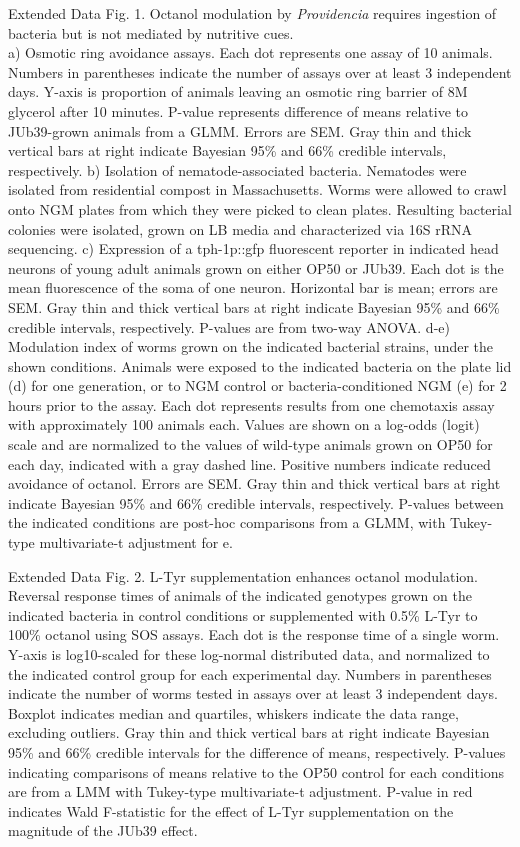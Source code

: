 \documentclass[]{article}
\begin{document}
Extended Data Fig. 1. Octanol modulation by \textit{Providencia}
requires ingestion of bacteria but is not mediated by nutritive cues.\\
a) Osmotic ring avoidance assays. Each dot represents one assay of 10
animals. Numbers in parentheses indicate the number of assays over at
least 3 independent days. Y-axis is proportion of animals leaving an
osmotic ring barrier of 8M glycerol after 10 minutes. P-value represents
difference of means relative to JUb39-grown animals from a GLMM. Errors
are SEM. Gray thin and thick vertical bars at right indicate Bayesian
95\% and 66\% credible intervals, respectively. b) Isolation of
nematode-associated bacteria. Nematodes were isolated from residential
compost in Massachusetts. Worms were allowed to crawl onto NGM plates
from which they were picked to clean plates. Resulting bacterial
colonies were isolated, grown on LB media and characterized via 16S rRNA
sequencing. c) Expression of a tph-1p::gfp fluorescent reporter in
indicated head neurons of young adult animals grown on either OP50 or
JUb39. Each dot is the mean fluorescence of the soma of one neuron.
Horizontal bar is mean; errors are SEM. Gray thin and thick vertical
bars at right indicate Bayesian 95\% and 66\% credible intervals,
respectively. P-values are from two-way ANOVA. d-e) Modulation index of
worms grown on the indicated bacterial strains, under the shown
conditions. Animals were exposed to the indicated bacteria on the plate
lid (d) for one generation, or to NGM control or bacteria-conditioned
NGM (e) for 2 hours prior to the assay. Each dot represents results from
one chemotaxis assay with approximately 100 animals each. Values are
shown on a log-odds (logit) scale and are normalized to the values of
wild-type animals grown on OP50 for each day, indicated with a gray
dashed line. Positive numbers indicate reduced avoidance of octanol.
Errors are SEM. Gray thin and thick vertical bars at right indicate
Bayesian 95\% and 66\% credible intervals, respectively. P-values
between the indicated conditions are post-hoc comparisons from a GLMM,
with Tukey-type multivariate-t adjustment for e.

Extended Data Fig. 2. L-Tyr supplementation enhances octanol modulation.
Reversal response times of animals of the indicated genotypes grown on
the indicated bacteria in control conditions or supplemented with 0.5\%
L-Tyr to 100\% octanol using SOS assays. Each dot is the response time
of a single worm. Y-axis is log10-scaled for these log-normal
distributed data, and normalized to the indicated control group for each
experimental day. Numbers in parentheses indicate the number of worms
tested in assays over at least 3 independent days. Boxplot indicates
median and quartiles, whiskers indicate the data range, excluding
outliers. Gray thin and thick vertical bars at right indicate Bayesian
95\% and 66\% credible intervals for the difference of means,
respectively. P-values indicating comparisons of means relative to the
OP50 control for each conditions are from a LMM with Tukey-type
multivariate-t adjustment. P-value in red indicates Wald F-statistic for
the effect of L-Tyr supplementation on the magnitude of the JUb39
effect.
\end{document}
